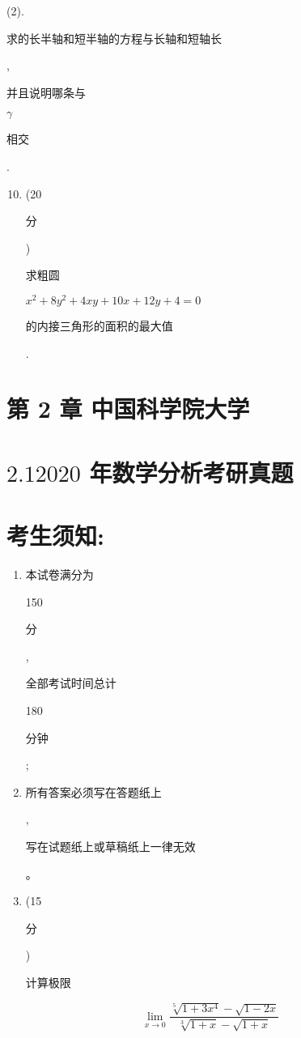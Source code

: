 \documentclass[10pt]{article}
\begin{document}
(2). \begin{CJK}{UTF8}{mj}求的长半轴和短半轴的方程与长轴和短轴长\end{CJK}, \begin{CJK}{UTF8}{mj}并且说明哪条与\end{CJK} $\gamma$ \begin{CJK}{UTF8}{mj}相交\end{CJK}.

\begin{enumerate}
  \setcounter{enumi}{9}
  \item (20 \begin{CJK}{UTF8}{mj}分\end{CJK}) \begin{CJK}{UTF8}{mj}求粗圆\end{CJK} $x^{2}+8 y^{2}+4 x y+10 x+12 y+4=0$ \begin{CJK}{UTF8}{mj}的内接三角形的面积的最大值\end{CJK}.
\end{enumerate}
\section{第 2 章 中国科学院大学}
\section{$2.12020$ 年数学分析考研真题}
\section{考生须知:}
\begin{enumerate}
  \item \begin{CJK}{UTF8}{mj}本试卷满分为\end{CJK} 150 \begin{CJK}{UTF8}{mj}分\end{CJK}, \begin{CJK}{UTF8}{mj}全部考试时间总计\end{CJK} 180 \begin{CJK}{UTF8}{mj}分钟\end{CJK};

  \item \begin{CJK}{UTF8}{mj}所有答案必须写在答题纸上\end{CJK}, \begin{CJK}{UTF8}{mj}写在试题纸上或草稿纸上一律无效\end{CJK}。

  \item (15 \begin{CJK}{UTF8}{mj}分\end{CJK}) \begin{CJK}{UTF8}{mj}计算极限\end{CJK}

\end{enumerate}
$$
\lim _{x \rightarrow 0} \frac{\sqrt[5]{1+3 x^{4}}-\sqrt{1-2 x}}{\sqrt[3]{1+x}-\sqrt{1+x}}
$$
\end{document}
